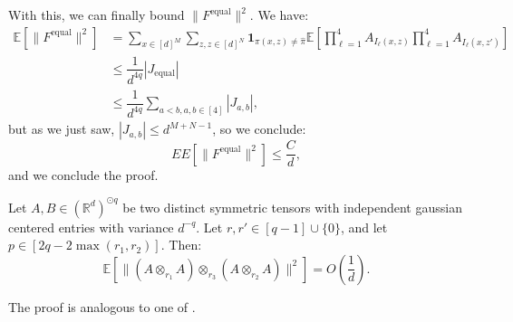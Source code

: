 \documentclass[]{article}
\makeatletter
\numberwithin{equation}{section}
\theoremstyle{definition}
\renewenvironment{proof}[1][\proofname]{\par
  \pushQED{\qed}%
  \normalfont \topsep6\p@\@plus6\p@\relax
  \trivlist
  \item[\hskip\labelsep\textbf{#1.}]\ignorespaces
}{%
  \popQED\endtrivlist\@endpefalse
}
\newcommand{\RR}{\mathbb{R}}
\newcommand{\EE}{\mathbb{E}}
\makeatother
\begin{document}
\begin{proof}
With this, we can finally bound $\| F^\mathrm{equal} \|^2$. We have:
\begin{align}
    \EE \left [  \| F^\mathrm{equal}\|^{2}\right ] & = \sum_{x\in[d]^{M}}\sum_{z,z \in [d]^{N}} \mathbf{1}_{\pi(x,z) \not = \hat{\pi}} \EE\left [\prod_{\ell = 1}^{4} A_{I_{\ell}(x,z)} \prod_{\ell = 1}^{4} A_{I_{\ell}(x,z')} \right ] \\
    & \leq \dfrac{1}{d^{4q}} \left | J_\mathrm{equal}\right | \\
    & \leq \dfrac{1}{d^{4q}} \sum_{a<b, a,b \in[4]} |J_{a,b} |,
\end{align}
but as we just saw, $|J_{a,b} | \leq d^{M+N-1}$, so we conclude:
\begin{equation}
    EE \left [  \| F^\mathrm{equal}\|^{2}\right ] \leq \dfrac{C}{d},
\end{equation}
and we conclude the proof. 
\end{proof}

\begin{lemma}
    Let $A,B \in (\RR^{d})^{\odot q}$ be two distinct symmetric tensors with independent gaussian centered entries with variance $d^{-q}$. Let $r,r' \in [q-1]\cup\{0\}$, and let $p \in [2q - 2\max(r_1,r_2)]$. 
    Then:
    \[
    \EE \left [ \| (A \otimes_{r_1} A) \otimes_{r_3} (A \otimes_{r_2} A)\|^{2}\right ] = O \left( \dfrac{1}{d}\right ).
    \]
\label{lemma:double_contraction_expectation_cross}
\end{lemma}

\begin{proof}
    The proof is analogous to one of .
\end{proof}
\end{document}
